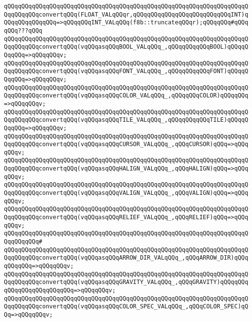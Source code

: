 \verb|qQQqqQQqqQQqqQQqqQQqqQQqqQQqqQQqqQQqqQQqqQQqqQQqqQQqqQQqqQQqqQQqqQQqqQQqqQQqqQQqconvertqQQq(FLOAT_VALqQQqr,qQQqqQQqqQQqqQQqqQQqqQQqqQQqINT)qQQqqQQqqQQqqQQq=>qQQqqQQqINT_VALqQQq(f8b::truncateqQQqr);qQQqqQQq#qQQqqQQq???qQQq|\newline
\verb|qQQqqQQqqQQqqQQqqQQqqQQqqQQqqQQqqQQqqQQqqQQqqQQqqQQqqQQqqQQqqQQqqQQqqQQqqQQqqQQqconvertqQQq(vqQQqasqQQqBOOL_VALqQQq_,qQQqqQQqqQQqBOOL)qQQqqQQqqQQq=>qQQqqQQqv;|\newline
\verb|qQQqqQQqqQQqqQQqqQQqqQQqqQQqqQQqqQQqqQQqqQQqqQQqqQQqqQQqqQQqqQQqqQQqqQQqqQQqqQQqconvertqQQq(vqQQqasqQQqFONT_VALqQQq_,qQQqqQQqqQQqFONT)qQQqqQQqqQQq=>qQQqqQQqv;|\newline
\verb|qQQqqQQqqQQqqQQqqQQqqQQqqQQqqQQqqQQqqQQqqQQqqQQqqQQqqQQqqQQqqQQqqQQqqQQqqQQqqQQqconvertqQQq(vqQQqasqQQqCOLOR_VALqQQq_,qQQqqQQqCOLOR)qQQqqQQq=>qQQqqQQqv;|\newline
\verb|qQQqqQQqqQQqqQQqqQQqqQQqqQQqqQQqqQQqqQQqqQQqqQQqqQQqqQQqqQQqqQQqqQQqqQQqqQQqqQQqconvertqQQq(vqQQqasqQQqTILE_VALqQQq_,qQQqqQQqqQQqTILE)qQQqqQQqqQQq=>qQQqqQQqv;|\newline
\verb|qQQqqQQqqQQqqQQqqQQqqQQqqQQqqQQqqQQqqQQqqQQqqQQqqQQqqQQqqQQqqQQqqQQqqQQqqQQqqQQqconvertqQQq(vqQQqasqQQqCURSOR_VALqQQq_,qQQqCURSOR)qQQq=>qQQqqQQqv;|\newline
\verb|qQQqqQQqqQQqqQQqqQQqqQQqqQQqqQQqqQQqqQQqqQQqqQQqqQQqqQQqqQQqqQQqqQQqqQQqqQQqqQQqconvertqQQq(vqQQqasqQQqHALIGN_VALqQQq_,qQQqHALIGN)qQQq=>qQQqqQQqv;|\newline
\verb|qQQqqQQqqQQqqQQqqQQqqQQqqQQqqQQqqQQqqQQqqQQqqQQqqQQqqQQqqQQqqQQqqQQqqQQqqQQqqQQqconvertqQQq(vqQQqasqQQqVALIGN_VALqQQq_,qQQqVALIGN)qQQq=>qQQqqQQqv;|\newline
\verb|qQQqqQQqqQQqqQQqqQQqqQQqqQQqqQQqqQQqqQQqqQQqqQQqqQQqqQQqqQQqqQQqqQQqqQQqqQQqqQQqconvertqQQq(vqQQqasqQQqRELIEF_VALqQQq_,qQQqRELIEF)qQQq=>qQQqqQQqv;|\newline
\verb|qQQqqQQqqQQqqQQqqQQqqQQqqQQqqQQqqQQqqQQqqQQqqQQqqQQqqQQqqQQqqQQqqQQqqQQqqQQqqQQq#|\newline
\verb|qQQqqQQqqQQqqQQqqQQqqQQqqQQqqQQqqQQqqQQqqQQqqQQqqQQqqQQqqQQqqQQqqQQqqQQqqQQqqQQqconvertqQQq(vqQQqasqQQqARROW_DIR_VALqQQq_,qQQqARROW_DIR)qQQqqQQqqQQq=>qQQqqQQqv;|\newline
\verb|qQQqqQQqqQQqqQQqqQQqqQQqqQQqqQQqqQQqqQQqqQQqqQQqqQQqqQQqqQQqqQQqqQQqqQQqqQQqqQQqconvertqQQq(vqQQqasqQQqGRAVITY_VALqQQq_,qQQqGRAVITY)qQQqqQQqqQQqqQQqqQQqqQQqqQQq=>qQQqqQQqv;|\newline
\verb|qQQqqQQqqQQqqQQqqQQqqQQqqQQqqQQqqQQqqQQqqQQqqQQqqQQqqQQqqQQqqQQqqQQqqQQqqQQqqQQqconvertqQQq(vqQQqasqQQqCOLOR_SPEC_VALqQQq_,qQQqCOLOR_SPEC)qQQq=>qQQqqQQqv;|\newline

